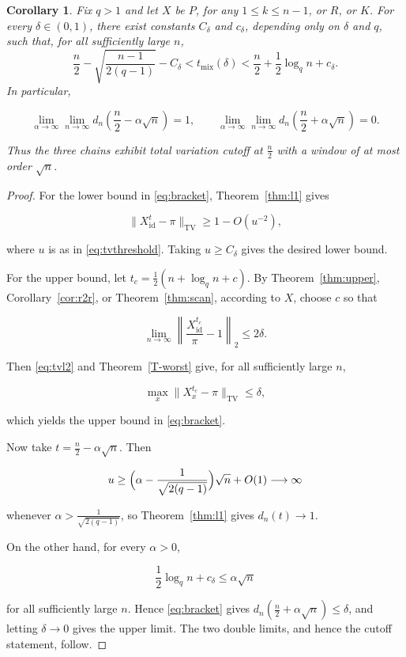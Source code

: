 \documentclass[11pt]{article}
\theoremstyle{plain}  %
\newtheorem{corollary}[theorem]{Corollary}
\begin{document}
\begin{corollary}\label{cor:tvmix}
Fix $q>1$ and let $X$ be $P$, for any $1\le k\le n-1$, or $R$, or $K$.
For every $\delta\in(0,1)$, there exist constants $C_\delta$ and $c_\delta$,
depending only on $\delta$ and $q$, such that, for all sufficiently large $n$,
\begin{equation}\label{eq:bracket}
\frac n2-\sqrt{\frac{n-1}{2(q-1)}}-C_\delta
< t_{\mathrm{mix}}(\delta)
< \frac n2+\frac12\log_q n+c_\delta.
\end{equation}
In particular,

\[
\lim_{\alpha\to\infty}
\lim_{n\to\infty}
d_n\left(\frac{n}{2}-\alpha\sqrt{n}\right)
=1,
 \qquad
\lim_{\alpha\to\infty}
\lim_{n\to\infty}
d_n\left(\frac{n}{2}+\alpha\sqrt{n}\right)
=0.
\]

Thus the three chains exhibit total variation cutoff at $\frac n2$ with a
window of at most order $\sqrt n$.
\end{corollary}

\begin{proof}
For the lower bound in \eqref{eq:bracket}, Theorem~\ref{thm:l1} gives

$$
\|X^t_{\mathrm{id}}-\pi\|_{\mathrm{TV}}\ge 1-O(u^{-2}),
$$

where $u$ is as in \eqref{eq:tvthreshold}. Taking $u\ge C_\delta$ gives the
desired lower bound.

For the upper bound, let $t_c=\frac12(n+\log_q n+c)$. By
Theorem~\ref{thm:upper}, Corollary~\ref{cor:r2r}, or
Theorem~\ref{thm:scan}, according to $X$, choose $c$ so that

$$
\lim_{n\to \infty}
\left\|\frac{X^{ t_c}_{\mathrm{id}}}{\pi}-1\right\|_2
\le 2\delta.
$$

Then \eqref{eq:tvl2} and Theorem~\ref{T-worst} give, for all sufficiently
large $n$,

$$
\max_x\|X_x^{ t_c}-\pi\|_{\mathrm{TV}}\le\delta,
$$

which yields the upper bound in \eqref{eq:bracket}.

Now take $t=\frac{n}{2}-\alpha\sqrt n$. Then

$$
u\ge
\Bigl(\alpha-\frac1{\sqrt{2(q-1)}}\Bigr)\sqrt n+O(1)\longrightarrow\infty
$$

whenever $\alpha>\frac{1}{\sqrt{2(q-1)}}$, so Theorem~\ref{thm:l1} gives
$d_n(t)\to1$.

On the other hand, for every $\alpha>0$,

$$
\frac12\log_q n+c_\delta\le\alpha\sqrt n
$$

for all sufficiently large $n$. Hence \eqref{eq:bracket} gives
$d_n( \frac{n}{2}+\alpha\sqrt n)\le\delta$, and letting $\delta\to0$
gives the upper limit. The two double limits, and hence the cutoff statement, follow.
\end{proof}
\end{document}
